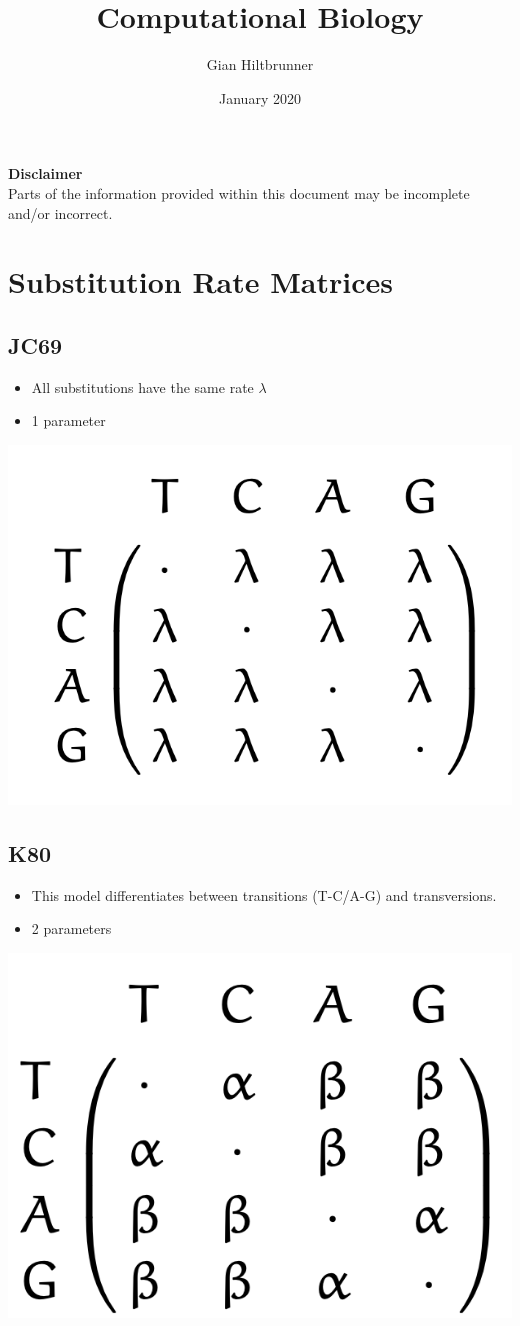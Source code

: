 \documentclass{article}
\title{Computational Biology}
\author{Gian Hiltbrunner}
\date{January 2020}
\begin{document}
\begin{multicols*}{3}

\maketitle

\begin{mdframed}[backgroundcolor=lred] 
    \textbf{Disclaimer}\\
    Parts of the information provided within this document may be incomplete and/or incorrect. 
\end{mdframed}

\section{Substitution Rate Matrices}

\subsection{JC69}
\begin{itemize}
    \item  All substitutions have the same rate $\lambda$
    \item 1 parameter
\end{itemize}

\begin{center}
    \includegraphics[width=0.5\linewidth]{js69.png}
\end{center}

\subsection{K80}
\begin{itemize}
    \item This model differentiates between transitions (T-C/A-G) and transversions. 
    \item 2 parameters
\end{itemize}

\begin{center}
    \includegraphics[width=0.5\linewidth]{k80.png}
\end{center}


\end{multicols*}
\end{document}
